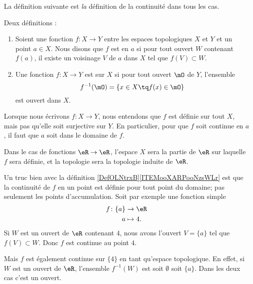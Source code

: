 La définition suivante est \emph{la} définition de la continuité dans tous les cas.
\begin{definition}\label{DefOLNtrxB}
    Deux définitions :
    \begin{enumerate}
        \item   \label{ITEMooXARPooNzsWLr}
            Soient une fonction \( f\colon X\to Y\) entre les espaces topologiques \( X\) et \( Y\) et un point \( a\in X\). Nous disons que \( f\) est  en \( a\) si pour tout ouvert \( W\) contenant \( f(a)\), il existe un voisinage \( V\) de \( a\) dans \( X\) tel que \( f(V)\subset W\).
        \item       \label{ITEMooEHGWooDdITRV}
    Une fonction \( f\colon X\to Y\) est  sur \( X\) si pour tout ouvert \( \mO\) de \( Y\), l'ensemble
    \begin{equation}      \label{defFminus1ofaset}
      f^{-1}(\mO) = \{ x \in X \tq f(x) \in \mO\}
    \end{equation}
est ouvert dans \( X\).
    \end{enumerate}
\end{definition}

\begin{normaltext}
    Lorsque nous écrivons \( f\colon X\to Y\), nous entendons que \( f\) est définie sur tout \( X\), mais pas qu'elle soit surjective sur \( Y\). En particulier, pour que \( f\) soit continue en \( a\), il faut que \( a\) soit dans le domaine de \( f\). 

    Dans le cas de fonctions \( \eR\to \eR\), l'espace \( X\) sera la partie de \( \eR\) sur laquelle \( f\) sera définie, et la topologie sera la topologie induite de \( \eR\).
\end{normaltext} 

\begin{example}
    Un truc bien avec la définition \ref{DefOLNtrxB}\ref{ITEMooXARPooNzsWLr} est que la continuité de \( f\) en un point est définie pour tout point du domaine; pas seulement les points d'accumulation. Soit par exemple une fonction simple
    \begin{equation}
        \begin{aligned}
            f\colon \{a\}&\to \eR \\
            a&\mapsto 4. 
        \end{aligned}
    \end{equation}
    Si \( W\) est un ouvert de \( \eR\) contenant \( 4\), nous avons l'ouvert \( V=\{a\}\) tel que \( f(V)\subset W\). Donc \( f\) est continue au point \( 4\).

    Mais \( f\) est également continue sur \( \{4\}\) en tant qu'espace topologique. En effet, si \( W\) est un ouvert de \( \eR\), l'ensemble \( f^{-1}(W)\) est soit \( \emptyset\) soit \( \{a\}\). Dans les deux cas c'est un ouvert.
\end{example}

